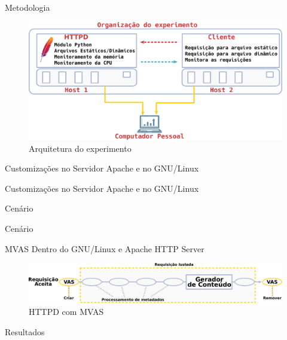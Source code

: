 \documentclass[xcolor={usenames,svgnames,dvipsnames},brazil,english,12pt,aspectratio=149]{beamer}
\begin{document}
\begin{frame}{Metodologia}
  \begin{figure}[!h] \centering
    \includegraphics[width=.90\textwidth]{experiment_arhitecture}
    \caption{Arquitetura do experimento} \label{fig:experiment_architecture}
  \end{figure}
\end{frame}

\begin{frame}{Customizações no Servidor Apache e no GNU/Linux}
  
\end{frame}

\begin{frame}{Customizações no Servidor Apache e no GNU/Linux}
  
\end{frame}

\begin{frame}{Cenário}
  
\end{frame}

\begin{frame}{Cenário}
  
\end{frame}

\begin{frame}{MVAS Dentro do GNU/Linux e Apache HTTP Server}
  \begin{figure}[!h]
    \centering
    \includegraphics[width=\textwidth]{mvas_httpd}
    \caption{HTTPD com MVAS}
    \label{fig:httpd_mvas}
  \end{figure}
\end{frame}

\begin{frame}{Resultados}
  
\end{frame}
\end{document}
